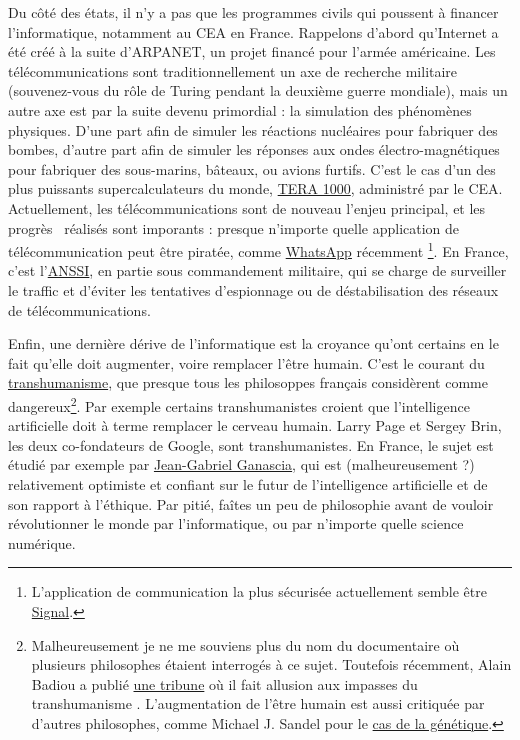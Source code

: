 \documentclass[10pt]{article}
\begin{document}
Du côté des états, il n'y a pas que les programmes civils qui poussent à financer l'informatique, notamment au CEA en France.
Rappelons d'abord qu'Internet a été créé à la suite d'ARPANET, un projet financé pour l'armée américaine. Les télécommunications
sont traditionnellement un axe de recherche militaire (souvenez-vous du rôle de Turing pendant la deuxième guerre mondiale),
mais un autre axe est par la suite devenu primordial : la simulation des phénomènes physiques. D'une part afin de simuler les réactions
nucléaires pour fabriquer des bombes, d'autre part afin de simuler les réponses aux ondes électro-magnétiques pour fabriquer
des sous-marins, bâteaux, ou avions furtifs. C'est le cas d'un des plus puissants supercalculateurs du monde,
\href{https://fr.wikipedia.org/wiki/TERA-1000}{TERA 1000}, administré par le CEA. Actuellement, les télécommunications sont de nouveau
l'enjeu principal, et les \og progrès \fg~réalisés sont imporants : presque n'importe quelle application de télécommunication peut être
piratée, comme
\href{https://www.lemonde.fr/pixels/article/2019/05/14/une-faille-de-securite-de-whatsapp-utilisee-pour-installer-un-logiciel-espion-israelien_5461861_4408996.html}{WhatsApp}
récemment \footnote{L'application de communication la plus sécurisée actuellement semble être \href{https://signal.org/}{Signal}.}.
En France, c'est l'\href{https://www.ssi.gouv.fr/}{ANSSI}, en partie sous commandement militaire, qui se charge de surveiller le traffic et d'éviter les tentatives d'espionnage
ou de déstabilisation des réseaux de télécommunications.


Enfin, une dernière dérive de l'informatique est la croyance qu'ont certains en
le fait qu'elle doit augmenter, voire remplacer l'être humain. C'est le courant du \href{https://fr.wikipedia.org/wiki/Transhumanisme}{transhumanisme},
que presque tous les philosoppes français considèrent comme dangereux\footnote{
  Malheureusement je ne me souviens plus du nom du documentaire où plusieurs philosophes étaient interrogés à ce sujet.
  Toutefois récemment, Alain Badiou a publié
  \href{https://www.lemonde.fr/series-d-ete-2018-long-format/article/2018/07/26/le-capitalisme-seul-responsable-de-l-exploitation-destructrice-de-la-nature_5336333_5325928.html?xtmc=badiou_capitalisme&xtcr=1}{une tribune}
  où il fait allusion aux \og impasses du transhumanisme \fg.
  L'augmentation de l'être humain est aussi critiquée par d'autres philosophes, comme Michael J. Sandel
  pour le \href{https://www.theatlantic.com/magazine/archive/2004/04/the-case-against-perfection/302927/}{cas de la génétique}.
}.
Par exemple certains transhumanistes croient que l'intelligence artificielle
doit à terme remplacer le cerveau humain.
Larry Page et Sergey Brin, les deux co-fondateurs de Google, sont transhumanistes.
En France, le sujet est étudié par exemple par \href{https://fr.wikipedia.org/wiki/Jean-Gabriel_Ganascia}{Jean-Gabriel Ganascia},
qui est (malheureusement ?) relativement optimiste et confiant sur le futur de l'intelligence artificielle et de son rapport à l'éthique.
Par pitié, faîtes un peu de philosophie avant de vouloir révolutionner le monde par l'informatique, ou par n'importe quelle science numérique.
\end{document}
